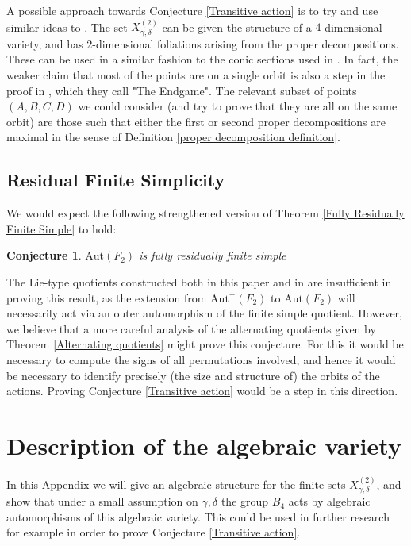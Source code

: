 \documentclass[letterpaper]{amsart}
\newtheorem{conjecture}[theorem]{Conjecture}
\begin{document}
A possible approach towards Conjecture \ref{Transitive action} is to try and use similar ideas to \cite{bourgain2016markoff}. The set $X_{\gamma,\delta}^{(2)}$ can be given the structure of a $4$-dimensional variety, and has $2$-dimensional foliations arising from the proper decompositions. These can be used in a similar fashion to the conic sections used in \cite{bourgain2016markoff}. In fact, the weaker claim that most of the points are on a single orbit is also a step in the proof in \cite{bourgain2016markoff}, which they call "The Endgame". The relevant subset of points $(A,B,C,D)$ we could consider (and try to prove that they are all on the same orbit) are those such that either the first or second proper decompositions are maximal in the sense of Definition \ref{proper decomposition definition}.

\subsection{Residual Finite Simplicity}
We would expect the following strengthened version of Theorem \ref{Fully Residually Finite Simple} to hold:
\begin{conjecture}
$\mathrm{Aut}(F_2)$ is fully residually finite simple
\end{conjecture}
The Lie-type quotients constructed both in this paper and in \cite{chen2025finite} are insufficient in proving this result, as the extension from $\mathrm{Aut}^+(F_2)$ to $\mathrm{Aut}(F_2)$ will necessarily act via an outer automorphism of the finite simple quotient.
However, we believe that a more careful analysis of the alternating quotients given by Theorem \ref{Alternating quotients} might prove this conjecture. For this it would be necessary to compute the signs of all permutations involved, and hence it would be necessary to identify precisely (the size and structure of) the orbits of the actions. Proving Conjecture \ref{Transitive action} would be a step in this direction.

\appendix
\section{Description of the algebraic variety}
In this Appendix we will give an algebraic structure for the finite sets $X^{(2)}_{\gamma,\delta}$, and show that under a small assumption on $\gamma,\delta$ the group $B_4$ acts by algebraic automorphisms of this algebraic variety. This could be used in further research for example in order to prove Conjecture \ref{Transitive action}.
\end{document}
